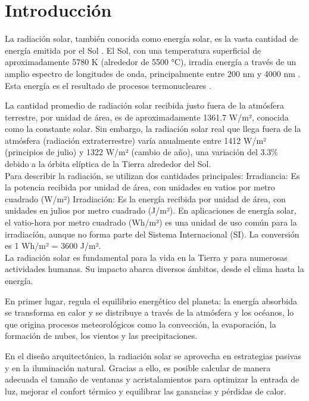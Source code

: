 \rhead{\newtitle}
\cfoot{\thepage}
\renewcommand{\headrulewidth}{1pt}
\renewcommand{\footrulewidth}{1pt}

\chapter{Introducción}\label{ch_1}

La radiación solar, también conocida como energía solar, es la vasta cantidad de energía emitida por el Sol \citep{Wald2007, Wald2021}. El Sol, con una temperatura superficial de aproximadamente 5780 K (alrededor de 5500 °C), irradia energía a través de un amplio espectro de longitudes de onda, principalmente entre 200 nm y 4000 nm \citep{Wald2021}. Esta energía es el resultado de procesos termonucleares \citep{Wald2021}.

La cantidad promedio de radiación solar recibida justo fuera de la atmósfera terrestre, por unidad de área, es de aproximadamente 1361.7 W/m², conocida como la constante solar. Sin embargo, la radiación solar real que llega fuera de la atmósfera (radiación extraterrestre) varía anualmente entre 1412 W/m² (principios de julio) y 1322 W/m² (cambio de año), una variación del 3.3\% debido a la órbita elíptica de la Tierra alrededor del Sol.\\


Para describir la radiación, se utilizan dos cantidades principales:
Irradiancia: Es la potencia recibida por unidad de área, con unidades en vatios por metro cuadrado (W/m²)
Irradiación: Es la energía recibida por unidad de área, con unidades en julios por metro cuadrado (J/m²).  En aplicaciones de energía solar, el vatio-hora por metro cuadrado (Wh/m²) es una unidad de uso común para la irradiación, aunque no forma parte del Sistema Internacional (SI). La conversión es 1 Wh/m² = 3600 J/m².\\


La radiación solar es fundamental para la vida en la Tierra y para numerosas actividades humanas. Su impacto abarca diversos ámbitos, desde el clima hasta la energía.

En primer lugar, regula el equilibrio energético del planeta: la energía absorbida se transforma en calor y se distribuye a través de la atmósfera y los océanos, lo que origina procesos meteorológicos como la convección, la evaporación, la formación de nubes, los vientos y las precipitaciones.

En el diseño arquitectónico, la radiación solar se aprovecha en estrategias pasivas y en la iluminación natural. Gracias a ello, es posible calcular de manera adecuada el tamaño de ventanas y acristalamientos para optimizar la entrada de luz, mejorar el confort térmico y equilibrar las ganancias y pérdidas de calor.

